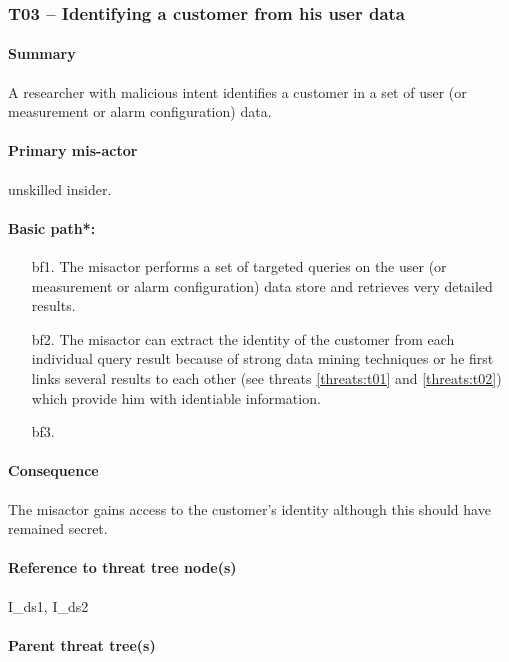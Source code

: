 \subsubsection{T03 -- Identifying a customer from his user data}
\label{threats:t03}

\paragraph{Summary}

\npar A researcher with malicious intent identifies a customer in a set of user
(or measurement or alarm configuration) data.

\paragraph{Primary mis-actor}

\npar unskilled insider.

\paragraph{Basic path*:}
\begin{enumerate}
	\item[bf1.] The misactor performs a set of targeted queries on the user
	(or measurement or alarm configuration) data store and retrieves very detailed
	results.
    \item[bf2.] The misactor can extract the identity of the customer from each
    individual query result because of strong data mining techniques or he first
    links several results to each other (see threats \ref{threats:t01} and
    \ref{threats:t02}) which provide him with identiable information.
    \item[bf3.]
\end{enumerate}

\paragraph{Consequence}

\npar The misactor gains access to the customer's identity although this should
have remained secret.

\paragraph{Reference to threat tree node(s)}

I\_ds1, I\_ds2

\paragraph{Parent threat tree(s)}


